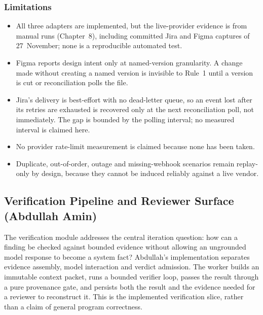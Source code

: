 \subsubsection{Limitations}
\begin{itemize}
  \item All three adapters are implemented, but the live-provider evidence is
        from manual runs (Chapter~8), including committed Jira and Figma
        captures of 27~November; none is a reproducible automated test.
  \item Figma reports design intent only at named-version granularity. A change
        made without creating a named version is invisible to Rule~1 until a
        version is cut or reconciliation polls the file.
  \item Jira's delivery is best-effort with no dead-letter queue, so an event
        lost after its retries are exhausted is recovered only at the next
        reconciliation poll, not immediately. The gap is bounded by the polling
        interval; no measured interval is claimed here.
  \item No provider rate-limit measurement is claimed because none has been
        taken.
  \item Duplicate, out-of-order, outage and missing-webhook scenarios remain
        replay-only by design, because they cannot be induced reliably against
        a live vendor.
\end{itemize}

\subsection{Verification Pipeline and Reviewer Surface (Abdullah Amin)}
\label{sec:impl-verification}

The verification module addresses the central iteration question: how can a
finding be checked against bounded evidence without allowing an ungrounded
model response to become a system fact? Abdullah's implementation separates
evidence assembly, model interaction and verdict admission. The worker builds
an immutable context packet, runs a bounded verifier loop, passes the result
through a pure provenance gate, and persists both the result and the evidence
needed for a reviewer to reconstruct it. This is the implemented verification
slice, rather than a claim of general program correctness.

